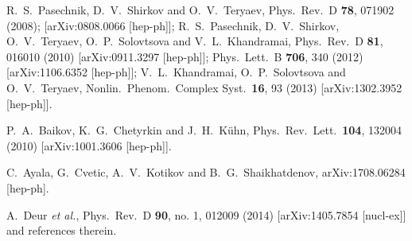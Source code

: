 \documentclass[3p,times,twocolumn]{elsarticle}
\begin{document}
\begin{thebibliography}{999}
  R.~S.~Pasechnik, D.~V.~Shirkov and O.~V.~Teryaev,
  Phys.\ Rev.\ D {\bf 78}, 071902 (2008); 
  [arXiv:0808.0066 [hep-ph]];
  R.~S.~Pasechnik, D.~V.~Shirkov, O.~V.~Teryaev, O.~P.~Solovtsova and V.~L.~Khandramai,
  Phys.\ Rev.\ D {\bf 81}, 016010 (2010)
  [arXiv:0911.3297 [hep-ph]];
  Phys.\ Lett.\ B {\bf 706}, 340 (2012)
  [arXiv:1106.6352 [hep-ph]];
  V.~L.~Khandramai, O.~P.~Solovtsova and O.~V.~Teryaev,
  Nonlin.\ Phenom.\ Complex Syst.\  {\bf 16}, 93 (2013)
  [arXiv:1302.3952 [hep-ph]].

  P.~A.~Baikov, K.~G.~Chetyrkin and J.~H.~K\"uhn,
  Phys.\ Rev.\ Lett.\  {\bf 104}, 132004 (2010)
  [arXiv:1001.3606 [hep-ph]].

  C.~Ayala, G.~Cvetic, A.~V.~Kotikov and B.~G.~Shaikhatdenov,
  arXiv:1708.06284 [hep-ph].

  A.~Deur {\it et al.},
  Phys.\ Rev.\ D {\bf 90}, no. 1, 012009 (2014)
  [arXiv:1405.7854 [nucl-ex]] and references therein.

\end{thebibliography}
\end{document}
